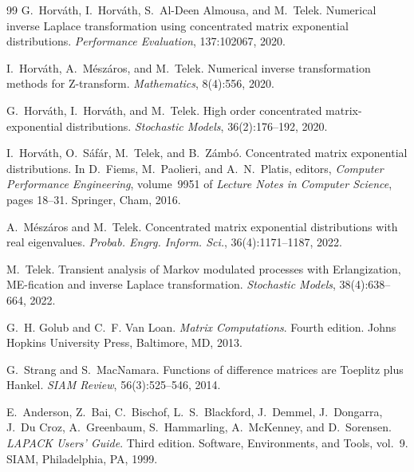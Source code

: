 \documentclass[11pt]{article}
\numberwithin{equation}{section}
\theoremstyle{remark}
\begin{document}
\begin{thebibliography}{99}
G.~Horv\'ath, I.~Horv\'ath, S.~Al-Deen Almousa, and M.~Telek.
\newblock Numerical inverse Laplace transformation using concentrated matrix exponential distributions.
\newblock \emph{Performance Evaluation}, 137:102067, 2020.

I.~Horv\'ath, A.~M\'esz\'aros, and M.~Telek.
\newblock Numerical inverse transformation methods for Z-transform.
\newblock \emph{Mathematics}, 8(4):556, 2020.

G.~Horv\'ath, I.~Horv\'ath, and M.~Telek.
\newblock High order concentrated matrix-exponential distributions.
\newblock \emph{Stochastic Models}, 36(2):176--192, 2020.

I.~Horv\'ath, O.~S\'af\'ar, M.~Telek, and B.~Z\'amb\'o.
\newblock Concentrated matrix exponential distributions.
\newblock In D.~Fiems, M.~Paolieri, and A.~N.~Platis, editors,
\emph{Computer Performance Engineering}, volume~9951 of
\emph{Lecture Notes in Computer Science}, pages 18--31.
Springer, Cham, 2016.

A.~M\'esz\'aros and M.~Telek.
\newblock Concentrated matrix exponential distributions with real eigenvalues.
\newblock \emph{Probab. Engrg. Inform. Sci.}, 36(4):1171--1187, 2022.

M.~Telek.
\newblock Transient analysis of Markov modulated processes with Erlangization, ME-fication and inverse Laplace transformation.
\newblock \emph{Stochastic Models}, 38(4):638--664, 2022.

G.~H. Golub and C.~F. Van Loan.
\newblock \emph{Matrix Computations}.
\newblock Fourth edition. Johns Hopkins University Press, Baltimore, MD, 2013.

G.~Strang and S.~MacNamara.
\newblock Functions of difference matrices are Toeplitz plus Hankel.
\newblock \emph{SIAM Review}, 56(3):525--546, 2014.

E.~Anderson, Z.~Bai, C.~Bischof, L.~S.~Blackford, J.~Demmel,
J.~Dongarra, J.~Du Croz, A.~Greenbaum, S.~Hammarling, A.~McKenney,
and D.~Sorensen.
\newblock \emph{LAPACK Users' Guide}.
\newblock Third edition. Software, Environments, and Tools, vol.~9.
SIAM, Philadelphia, PA, 1999.


\end{thebibliography}
\end{document}
